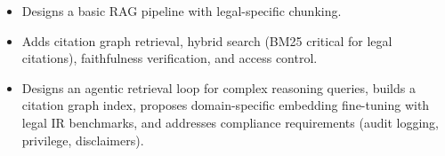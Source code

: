\begin{interviewq}

\goodgreat
\begin{itemize}
    \item {} Designs a basic RAG pipeline with legal-specific chunking.
    \item {} Adds citation graph retrieval, hybrid search (BM25 critical for legal citations), faithfulness verification, and access control.
    \item {} Designs an agentic retrieval loop for complex reasoning queries, builds a citation graph index, proposes domain-specific embedding fine-tuning with legal IR benchmarks, and addresses compliance requirements (audit logging, privilege, disclaimers).
\end{itemize}

\end{interviewq}


